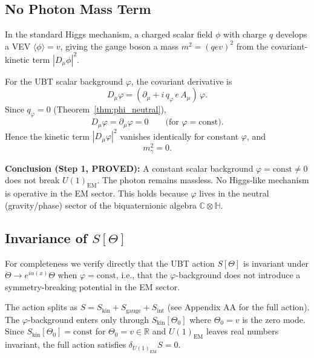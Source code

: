 \documentclass[12pt]{article}
\theoremstyle{definition}
\theoremstyle{remark}
\begin{document}
\subsection{No Photon Mass Term}

In the standard Higgs mechanism, a charged scalar field $\phi$ with charge $q$ develops a
VEV $\langle\phi\rangle = v$, giving the gauge boson a mass
$m^2 = (qev)^2$ from the covariant-kinetic term $|D_\mu\phi|^2$.

For the UBT scalar background $\varphi$, the covariant derivative is
\begin{equation}
  D_\mu\varphi = (\partial_\mu + i\,q_\varphi\, e\, A_\mu)\,\varphi.
\end{equation}
Since $q_\varphi = 0$ (Theorem~\ref{thm:phi_neutral}),
\begin{equation}
  D_\mu\varphi = \partial_\mu\varphi = 0
  \qquad\text{(for }\varphi=\mathrm{const}\text{)}.
\end{equation}
Hence the kinetic term $|D_\mu\varphi|^2$ vanishes identically for constant $\varphi$, and
\begin{equation}
  \boxed{m_\gamma^2 = 0.}
\end{equation}

\begin{resultbox}
\textbf{Conclusion (Step 1, PROVED):}
A constant scalar background $\varphi = \mathrm{const} \neq 0$ does not break $U(1)_\mathrm{EM}$.
The photon remains massless.  No Higgs-like mechanism is operative in the EM sector.
This holds because $\varphi$ lives in the neutral (gravity/phase) sector of the
biquaternionic algebra $\mathbb{C}\otimes\mathbb{H}$.
\end{resultbox}

\subsection{Invariance of $S[\Theta]$}

For completeness we verify directly that the UBT action $S[\Theta]$ is invariant under
$\Theta \to e^{i\alpha(x)}\Theta$ when $\varphi = \mathrm{const}$, i.e., that the
$\varphi$-background does not introduce a symmetry-breaking potential in the EM sector.

The action splits as $S = S_\mathrm{kin} + S_\mathrm{gauge} + S_\mathrm{int}$ (see
Appendix AA for the full action).  The $\varphi$-background enters only through
$S_\mathrm{kin}[\Theta_0]$ where $\Theta_0 = v$ is the zero mode.  Since
$S_\mathrm{kin}[\Theta_0] = \mathrm{const}$ for $\Theta_0 = v \in \mathbb{R}$ and
$U(1)_\mathrm{EM}$ leaves real numbers invariant, the full action satisfies
$\delta_{U(1)_\mathrm{EM}} S = 0$.
\end{document}
